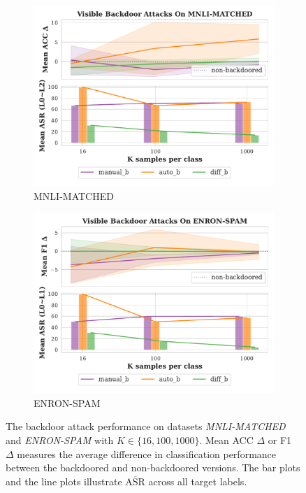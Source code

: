 \begin{figure}[!ht]
\begin{subfigure}{.5\textwidth}
  \centering
  \includegraphics[width=\linewidth]{figures/evaluation_media/MNLI-MATCHED_score_n_attack.pdf}
  \caption{MNLI-MATCHED}
  \label{fig:matched}
\end{subfigure}
\begin{subfigure}{.5\textwidth}
  \centering
  \includegraphics[width=\linewidth]{figures/evaluation_media/ENRON-SPAM_score_n_attack.pdf}
  \caption{ENRON-SPAM}
  \label{fig:enron}
\end{subfigure}
\caption{The backdoor attack performance on datasets \textit{MNLI-MATCHED} and \textit{ENRON-SPAM} with $K \in \{16,100,1000\}$. Mean ACC $\Delta$ or F1 $\Delta$ measures the average difference in classification performance between the backdoored and non-backdoored versions. The bar plots and the line plots illustrate $\overline{\text{ASR}}$ across all target labels.}
\label{fig:score_n_attack_extra}
\end{figure}